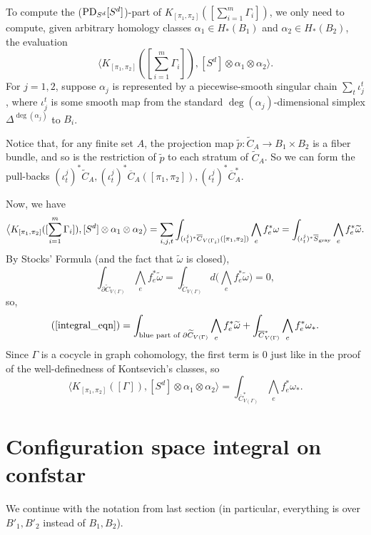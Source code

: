 \documentclass[11pt]{article}
\theoremstyle{definition}
\theoremstyle{remark}
\def\wt#1{\widetilde{#1}}
\def\ov#1{\overline{#1}}
\def\sgray{{\textnormal{gray}}}
\def\tn#1{\textnormal{#1}}
\begin{document}
To compute the ($\tn{PD}_{S^d}[S^d]$)-part of $K_{[\pi_1,\pi_2]}([\sum_{i=1}^m\Gamma_i])$, we only need to compute, given arbitrary homology classes $\alpha_1\in H_*(B_1)$ and $\alpha_2\in H_*(B_2)$, the evaluation
$$\big\langle K_{[\pi_1,\pi_2]}([\sum_{i=1}^m\Gamma_i]), [S^d]\otimes\alpha_1\otimes\alpha_2 \big\rangle.$$
For $j=1,2$, suppose $\alpha_j$ is represented by a
piecewise-smooth singular chain $\sum_{t}\iota^t_j$, where $\iota^t_j$ is some smooth map from the standard $\deg(\alpha_j)$-dimensional simplex $\Delta^{\deg(\alpha_j)}$ to $B_i$. 

Notice that, for any finite set $A$, the projection map 
$\wt{p}:\wt{C}_A\to B_1\times B_2$
is a fiber bundle, and so is the restriction of $\wt{p}$ to each stratum of $\wt{C}_A$.
So we can form the pull-backs $(\iota^j_t)^*\wt{C}_A,(\iota^j_t)^*\ov{C}_A([\pi_1,\pi_2]),(\iota^j_t)^*\ov{C}^*_A$. 

Now, we have 
\begin{align}
\label{integral_eqn}
\big\langle K_{[\pi_1,\pi_2]}([\sum_{i=1}^m\Gamma_i]), [S^d]\otimes\alpha_1\otimes\alpha_2 \big\rangle=
\sum_{i,j,t}\int_{(\iota_t^j)^*\ov{C}_{V(\Gamma_i)}([\pi_1,\pi_2])}\bigwedge_{e}f_e^*{\omega}=
\int_{(\iota^j_t)^*\ov{S}_{\sgray}}\bigwedge_{e}f_e^*\wt{\omega}.
\end{align}
By Stocks' Formula (and the fact that $\wt\omega$ is closed), 
$$\int_{\partial\wt{C}_{V(\Gamma)}}\bigwedge_{e}f_e^*\wt{\omega}=\int_{\wt{C}_{V(\Gamma)}}d\Big(\bigwedge_{e}f_e^*\wt{\omega}\Big)=0,$$
so, 
$$(\ref{integral_eqn})=\int_{\tn{blue part of }\partial\wt{C}_{V(\Gamma)}}\bigwedge_{e}f_e^*\wt{\omega}+\int_{\ov{C}^*_{V(\Gamma)}}\bigwedge_{e}f_e^*{\omega_*}.$$
Since $\Gamma$ is a cocycle in graph cohomology, the first term is 0 just like in the proof of the well-definedness of Kontsevich's classes, so
$$\big\langle K_{[\pi_1,\pi_2]}([\Gamma]), [S^d]\otimes\alpha_1\otimes\alpha_2 \big\rangle=
\int_{\ov{C}^*_{V(\Gamma)}}\bigwedge_{e}f_e^*{\omega_*}.$$

\section{Configuration space integral on confstar}

We continue with the notation from last section (in particular, everything is over $B'_1, B'_2$ instead of $B_1, B_2$). 
\end{document}
